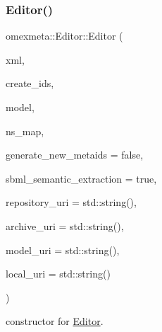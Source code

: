 \subsubsection{\texorpdfstring{Editor()}{Editor()}}
{\footnotesize\ttfamily omexmeta\+::\+Editor\+::\+Editor (\begin{DoxyParamCaption}\item[{const std\+::string \&}]{xml,  }\item[{bool}]{create\+\_\+ids,  }\item[{const \hyperlink{classredland_1_1LibrdfModel}{Librdf\+Model} \&}]{model,  }\item[{Namespace\+Map \&}]{ns\+\_\+map,  }\item[{bool}]{generate\+\_\+new\+\_\+metaids = {\ttfamily false},  }\item[{bool}]{sbml\+\_\+semantic\+\_\+extraction = {\ttfamily true},  }\item[{const std\+::string \&}]{repository\+\_\+uri = {\ttfamily std\+:\+:string()},  }\item[{const std\+::string \&}]{archive\+\_\+uri = {\ttfamily std\+:\+:string()},  }\item[{const std\+::string \&}]{model\+\_\+uri = {\ttfamily std\+:\+:string()},  }\item[{const std\+::string \&}]{local\+\_\+uri = {\ttfamily std\+:\+:string()} }\end{DoxyParamCaption})\hspace{0.3cm}{\ttfamily [explicit]}}



constructor for \hyperlink{classomexmeta_1_1Editor}{Editor}. 


